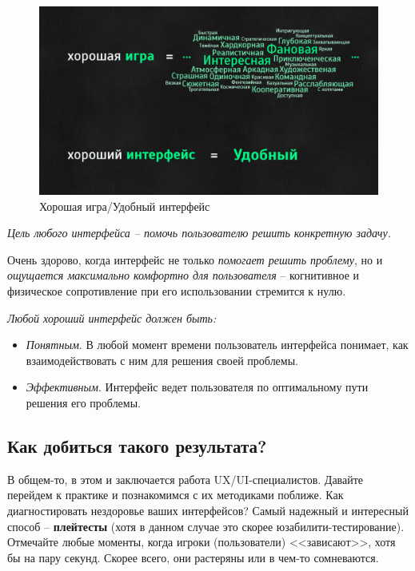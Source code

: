 \documentclass{article}
\begin{document}
\begin{figure}[H]
  \includegraphics[width=\textwidth]{res/img/goodGame.png}
  \caption{Хорошая игра/Удобный интерфейс}
\end{figure}

\textit{Цель любого интерфейса – помочь пользователю решить конкретную задачу.}

Очень здорово, когда интерфейс не только \textit{помогает решить проблему}, но и \textit{ощущается максимально комфортно для пользователя} -- когнитивное и физическое сопротивление при его использовании стремится к нулю.

\bigskip

\noindent\textit{Любой хороший интерфейс должен быть:}
\begin{itemize}
  \item \textit{Понятным}. В любой момент времени пользователь интерфейса понимает, как взаимодействовать с ним для решения своей проблемы.
  \item \textit{Эффективным}. Интерфейс ведет пользователя по оптимальному пути решения его проблемы.
\end{itemize}

\subsection{Как добиться такого результата?}
В общем-то, в этом и заключается работа UX/UI-специалистов. Давайте перейдем к практике и познакомимся с их методиками поближе. Как диагностировать нездоровье ваших интерфейсов? Самый надежный и интересный способ -- \textbf{плейтесты} (хотя в данном случае это скорее юзабилити-тестирование). Отмечайте любые моменты, когда игроки (пользователи) <<зависают>>, хотя бы на пару секунд. Скорее всего, они растеряны или в чем-то сомневаются.
\end{document}
